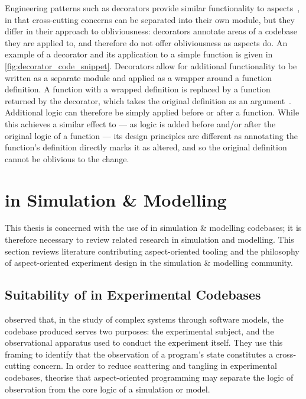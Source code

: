 Engineering patterns such as decorators provide similar functionality to
aspects~\cite{friesel2017annotations}, in that cross-cutting concerns can be
separated into their own module, but they differ in their approach to
obliviousness: decorators annotate areas of a codebase they are applied to, and
therefore do not offer obliviousness as aspects do. An example of a decorator
and its application to a simple function is given in
\cref{fig:decorator_code_snippet}. Decorators allow for additional functionality
to be written as a separate module and applied as a wrapper around a function
definition. A function with a wrapped definition is replaced by a function
returned by the decorator, which takes the original definition as an
argument~\citep{gof_design_patterns}. Additional logic can therefore be simply
applied before or after a function. While this achieves a similar effect to
\aspectorientation{} --- as logic is added before and/or after the original
logic of a function --- its design principles are different as annotating the
function's definition directly marks it as altered, and so the original
definition cannot be oblivious to the change.



\section{\AspectOrientation{} in Simulation \& Modelling}
\label{sec:ao_and_modelling}

This thesis is concerned with the use of \aspectorientation{} in simulation \&
modelling codebases; it is therefore necessary to review related research in
simulation and modelling. This section reviews literature contributing
aspect-oriented tooling and the philosophy of aspect-oriented experiment design
in the simulation \& modelling community.

\subsection{Suitability of \AspectOrientation{} in Experimental Codebases}
\label{review_gulyas_use_of_aop_in_research_codebases}

\citet{gulyas1999use} observed that, in the study of complex systems through
software models, the codebase produced serves two purposes: the
experimental subject, and the observational apparatus used to conduct the
experiment itself. They use this framing to identify that the observation of a
program's state constitutes a cross-cutting concern. In order to reduce
scattering and tangling in experimental codebases, \citeauthor{gulyas1999use}
theorise that aspect-oriented programming may separate the logic of observation
from the core logic of a simulation or model.

